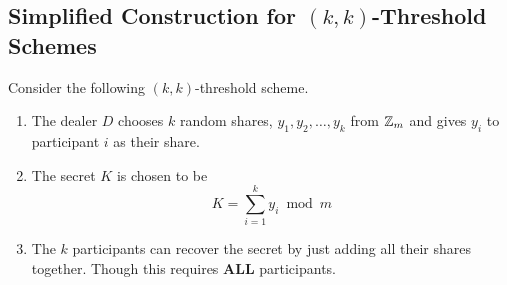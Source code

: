 \subsection{\texorpdfstring{Simplified Construction for $(k, k)$-Threshold Schemes}{Simplified Construction for Threshold Schemes}}\label{subsec:Simplified_Construction_Threshold_Schemes}
Consider the following $(k, k)$-threshold scheme.
\begin{enumerate}[noitemsep]
\item The dealer $D$ chooses $k$ random shares, $y_{1}, y_{2}, \ldots, y_{k}$ from $\operatorname{\mathbb{Z}}_{m}$ and gives $y_{i}$ to participant $i$ as their share.
\item The secret $K$ is chosen to be
  \begin{equation}\label{eq:Simplified_Construction_Threshold_Scheme}
    K = \sum\limits_{i=1}^{k}y_{i} \bmod m
  \end{equation}
\item The $k$ participants can recover the secret by just adding all their shares together. Though this requires \textbf{ALL} participants.
\end{enumerate}

